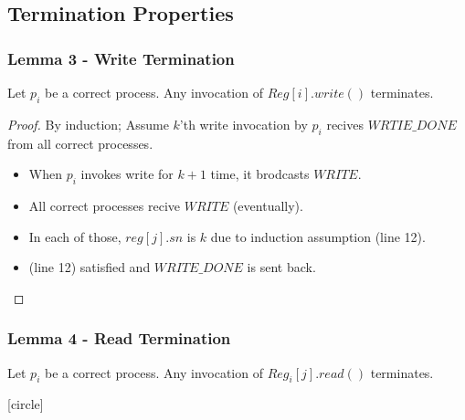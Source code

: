 \subsection{Termination Properties}
\begin{frame}
    \frametitle{Lemma 3 - Write Termination}
    \begin{lemma}
        Let $p_i$ be a correct process.
        Any invocation of $Reg[i].write()$ terminates.
    \end{lemma}
    \begin{proof}
        By induction; Assume $k$'th write invocation by $p_i$ recives $WRTIE\_DONE$ from all correct processes.
        \begin{itemize}
            \item When $p_i$ invokes write for $k+1$ time, it brodcasts $WRITE$.
            \item All correct processes recive $WRITE$ (eventually).
            \item In each of those, $reg[j].sn$ is $k$ due to induction assumption (line 12).
            \item (line 12) satisfied and $WRITE\_DONE$ is sent back.
        \end{itemize}
    \end{proof}
\end{frame}
\begin{frame}
    \frametitle{Lemma 4 - Read Termination}
    \begin{lemma}
        Let $p_i$ be a correct process. Any invocation of $Reg_i[j].read()$ terminates.
    \end{lemma}
\end{frame}
[circle]
